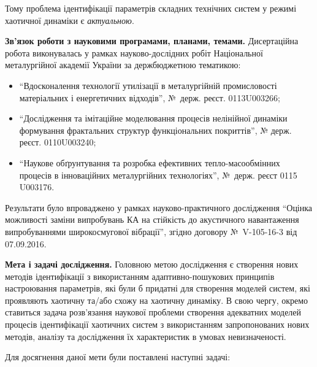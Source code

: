 \documentclass[a4paper,13pt]{atuaref}
\begin{document}
Тому проблема
ідентифікації параметрів складних технічних систем у режимі хаотичної динаміки
є \textit{актуальною}.

\smallskip
\textbf{Зв'язок роботи з науковими програмами, планами, темами.}
Дисертаційна робота виконувалась у рамках науково-дослідних робіт
Національної металургійної академії України за держбюджетною
тематикою:

\begin{itemize}


\item
  ``Вдосконалення технології утилізації в металургійній промисловості
  матеріальних і енергетичних відходів'', №~держ. реєст. 0113U003266;

  \item
  ``Дослідження та імітаційне моделювання процесів нелінійної динаміки
  формування фрактальних структур функціональних   покриттів'',
  № держ. реєст. 0110U003240;

  \item
  ``Наукове обґрунтування та розробка ефективних тепло-масообмінних
  процесів в інноваційних металургійних технологіях'', №~держ. реєст 0115 U003176.

\end{itemize}

Результати було впроваджено у рамках науково-практичного дослідження
``Оцінка можливості заміни випробувань КА на стійкість до акустичного навантаження
випробуваннями широкосмугової вібрації'', згідно договору №~V-105-16-3 від 07.09.2016.

\textbf{Мета і задачі дослідження.}
Головною метою дослідження є створення нових методів ідентифікації з
використанням адаптивно-пошукових принципів настроювання параметрів, які
були б придатні для створення моделей систем, які проявляють хаотичну
та/або схожу на хаотичну динаміку. В свою чергу, окремо ставиться задача
розв'язання наукової проблеми створення адекватних моделей процесів
ідентифікації хаотичних систем з використанням запропонованих нових
методів, аналізу та дослідження їх характеристик в умовах невизначеності.

Для досягнення даної мети були поставлені наступні задачі:
\end{document}
